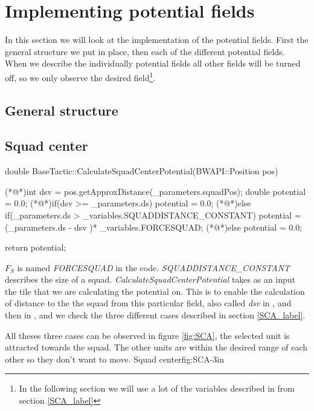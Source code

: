 {\color[rgb]{0.000000,0.000000,0.000000}\section{Implementing potential fields}
	In this section we will look at the implementation of the potential fields.
	First the general structure we put in place, then each of the different potential fields. When we describe the individually potential fields all other fields will be turned off, so we only observe the desired field\footnote{In the following section we will use a lot of the variables described in from section \ref{SCA_label}}.
	
	\subsection{General structure}
	
	
	
	\subsection{Squad center}	
		\begin{Sourcecode}[caption=Squad center]
double BaseTactic::CalculateSquadCenterPotential(BWAPI::Position pos)
{
	(*@\lnote@*)int dsv = pos.getApproxDistance(_parameters.squadPos);	
	double potential = 0.0;
	(*@\lnote@*)if(dsv >= _parameters.ds)
		potential = 0.0;
	(*@\lnote@*)else if(_parameters.ds > _variables.SQUADDISTANCE_CONSTANT)
		potential = (_parameters.ds - dsv )* _variables.FORCESQUAD;
	(*@\lnote@*)else
		potential = 0.0;

	return potential;
}
\end{Sourcecode}
		$F_{S}$ is named \textit{FORCESQUAD} in the code.
		\textit{SQUADDISTANCE\_CONSTANT} describes the size of a squad. 
		\textit{CalculateSquadCenterPotential} takes as an input the tile that we are calculating the potential on. This is to enable the calculation of distance to the the squad from this particular field, also called \textit{dsv} in , and then in , and  we check the three different cases described in section \ref{SCA_label}.		
		
		All theses three cases can be observed in figure \ref{fig:SCA}, the selected unit is attracted towards the squad. The other units are within the desired range of each other so they don't want to move.
			{Squad center}{fig:SCA}{-3in}
				 
}
